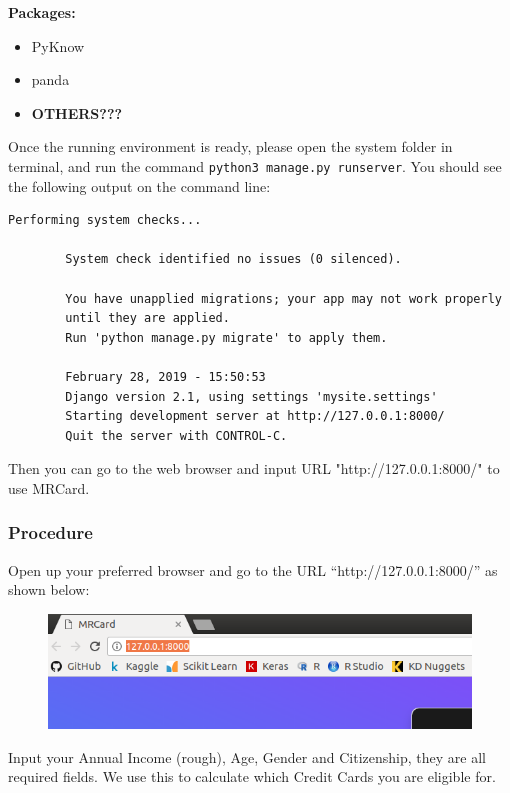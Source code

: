 	\textbf{Packages:}
	\begin{itemize}
		\item PyKnow
		\item panda
		\item \textbf{OTHERS???}
	\end{itemize}

	Once the running environment is ready, please open the system folder in terminal, and run the command \verb|python3 manage.py runserver|. You should see the following output on the command line:

	\begin{lstlisting}[style=DOS, frame=single, gobble=7, tabsize=4, showstringspaces=false]
		Performing system checks...

		System check identified no issues (0 silenced).

		You have unapplied migrations; your app may not work properly
		until they are applied.
		Run 'python manage.py migrate' to apply them.

		February 28, 2019 - 15:50:53
		Django version 2.1, using settings 'mysite.settings'
		Starting development server at http://127.0.0.1:8000/
		Quit the server with CONTROL-C.
	\end{lstlisting}

	Then you can go to the web browser and input URL "http://127.0.0.1:8000/" to use MRCard.


	\subsubsection{Procedure} %
	\label{ssub:start}
		Open up your preferred browser and go to the URL “http://127.0.0.1:8000/” as shown below:

		\begin{figure}[H]
			\centering
			\includegraphics[width=\linewidth]{img/url.png}
		\end{figure}

		Input your Annual Income (rough), Age, Gender and Citizenship, they are all required fields. We use this to calculate which Credit Cards you are eligible for.

